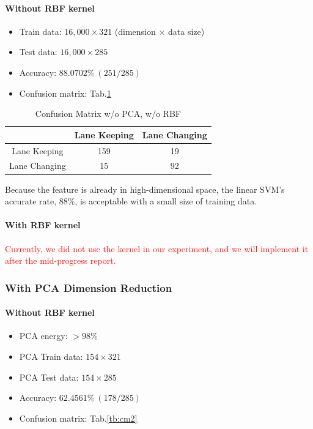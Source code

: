 \documentclass[10pt,twocolumn,letterpaper]{article}
\begin{document}
\paragraph{Without RBF kernel}

\begin{itemize}
	\item Train data: $16,000 \times 321$ (dimension $\times$ data size)
	\item Test data: $16,000 \times 285$
	\item Accuracy: $88.0702\%~(251/285)$
	\item Confusion matrix: Tab.\ref{tb:cm1}
\end{itemize}

\begin{table}
	\caption{Confusion Matrix w/o PCA, w/o RBF}
	\label{tb:cm1}
	\begin{tabular}{|c|c|c|}
		\hline
		& Lane Keeping & Lane Changing \\
		\hline
		Lane Keeping & 159 & 19 \\
		\hline
		Lane Changing & 15 & 92 \\
		\hline
\end{tabular}
\end{table}

Because the feature is already in high-dimensional space, the linear SVM's accurate rate, $88\%$, is acceptable with a small size of training data.

\paragraph{With RBF kernel}

\textcolor{red}{Currently, we did not use the kernel in our experiment, and we will implement it after the mid-progress report.}

\subsubsection{With PCA Dimension Reduction}

\paragraph{Without RBF kernel}

\begin{itemize}
	\item PCA energy: $>98\%$
	\item PCA Train data: $154 \times 321$
	\item PCA Test data: $154 \times 285$
	\item Accuracy: $62.4561\%~(178/285)$
	\item Confusion matrix: Tab.\ref{tb:cm2}
	

\end{itemize}
\end{document}
